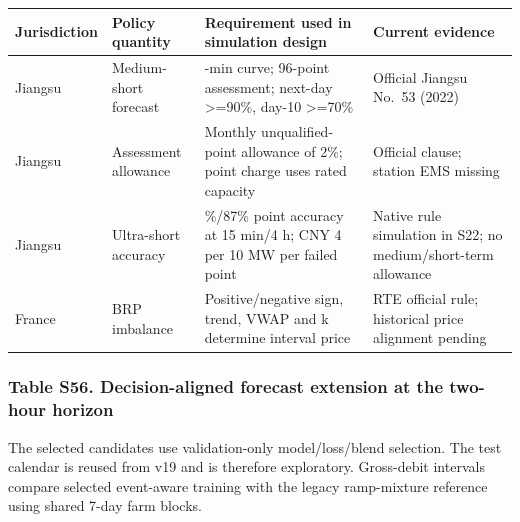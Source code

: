 \documentclass[a4paper,11pt]{article}
\newcounter{none}
\begin{document}
{\def\LTcaptype{none} %
\begin{longtable}[]{@{}
  >{\raggedright\arraybackslash}p{}
  >{\raggedright\arraybackslash}p{}
  >{\raggedright\arraybackslash}p{}
  >{\raggedright\arraybackslash}p{}@{}}
\toprule\noalign{}
\begin{minipage}[b]{\linewidth}\raggedright
Jurisdiction
\end{minipage} & \begin{minipage}[b]{\linewidth}\raggedright
Policy quantity
\end{minipage} & \begin{minipage}[b]{\linewidth}\raggedright
Requirement used in simulation design
\end{minipage} & \begin{minipage}[b]{\linewidth}\raggedright
Current evidence
\end{minipage} \\
\midrule\noalign{}
\endhead
\bottomrule\noalign{}
\endlastfoot
Jiangsu & Medium-short forecast & 15-min curve; 96-point assessment; next-day \textgreater=90\%, day-10 \textgreater=70\% & Official Jiangsu No.~53 (2022) \\
Jiangsu & Assessment allowance & Monthly unqualified-point allowance of 2\%; point charge uses rated capacity & Official clause; station EMS missing \\
Jiangsu & Ultra-short accuracy & 97\%/87\% point accuracy at 15 min/4 h; CNY 4 per 10 MW per failed point & Native rule simulation in S22; no medium/short-term allowance \\
France & BRP imbalance & Positive/negative sign, trend, VWAP and k determine interval price & RTE official rule; historical price alignment pending \\
\end{longtable}
}

\subsubsection{Table S56. Decision-aligned forecast extension at the two-hour horizon}\label{table-s56.-decision-aligned-forecast-extension-at-the-two-hour-horizon}

The selected candidates use validation-only model/loss/blend selection. The test calendar is reused from v19 and is therefore exploratory. Gross-debit intervals compare selected event-aware training with the legacy ramp-mixture reference using shared 7-day farm blocks.
\end{document}
